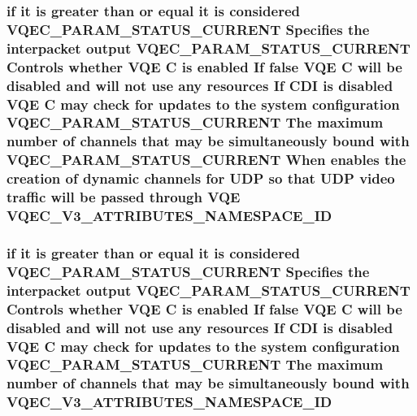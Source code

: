 \subsubsection{\setlength{\rightskip}{0pt plus 5cm}if it is greater than or equal it is considered VQEC\_\-PARAM\_\-STATUS\_\-CURRENT Specifies the interpacket output VQEC\_\-PARAM\_\-STATUS\_\-CURRENT Controls whether VQE \bf{C} is enabled If false VQE \bf{C} will be disabled and will not use any resources If CDI is disabled VQE \bf{C} may check for updates \bf{to} the system configuration VQEC\_\-PARAM\_\-STATUS\_\-CURRENT The maximum number of \bf{channels} that may be simultaneously bound with VQEC\_\-PARAM\_\-STATUS\_\-CURRENT When enables the creation of dynamic \bf{channels} for UDP so that UDP video traffic will be passed through VQE \bf{VQEC\_\-V3\_\-ATTRIBUTES\_\-NAMESPACE\_\-ID}}\label{vqec__cfg__settings_8h_d0b8dfdb887dc11bbc41619806bd12af}


\subsubsection{\setlength{\rightskip}{0pt plus 5cm}if it is greater than or equal it is considered VQEC\_\-PARAM\_\-STATUS\_\-CURRENT Specifies the interpacket output VQEC\_\-PARAM\_\-STATUS\_\-CURRENT Controls whether VQE \bf{C} is enabled If false VQE \bf{C} will be disabled and will not use any resources If CDI is disabled VQE \bf{C} may check for updates \bf{to} the system configuration VQEC\_\-PARAM\_\-STATUS\_\-CURRENT The maximum number of \bf{channels} that may be simultaneously bound with \bf{VQEC\_\-V3\_\-ATTRIBUTES\_\-NAMESPACE\_\-ID}}\label{vqec__cfg__settings_8h_e3efeea4951212d35c8cd16ca6b6b222}


